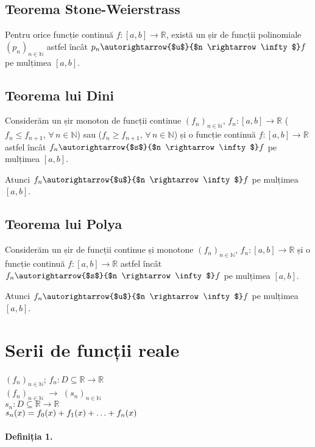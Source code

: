 \subsection{Teorema Stone-Weierstrass}
Pentru orice funcție continuă $f:[a,b] \rightarrow \mathbb{R}$, există un
șir de funcții polinomiale $(p_{n})_{n \in \mathbb{N}}$ astfel încât $p_{n}
\autorightarrow{$u$}{$n \rightarrow \infty$} f$ pe mulțimea $[a, b]$.

\subsection{Teorema lui Dini}
Considerăm un șir monoton de funcții continue $(f_{n})_{n \in \mathbb{N}}$,
$f_{n}: [a, b] \rightarrow \mathbb{R}$ ($f_{n} \leq f_{n+1}$, $\forall \, n
\in \mathbb{N}$) sau ($f_{n} \geq f_{n+1}$, $\forall \, n \in \mathbb{N}$)
și o funcție continuă $f: [a, b] \rightarrow \mathbb{R}$ astfel încât $f_{n}
\autorightarrow{$s$}{$n \rightarrow \infty$} f$ pe mulțimea $[a, b]$.

Atunci $f_{n} \autorightarrow{$u$}{$n \rightarrow \infty$} f$ pe mulțimea
$[a, b]$.

\subsection{Teorema lui Polya}
Considerăm un șir de funcții continue și monotone $(f_{n})_{n \in
\mathbb{N}}$, $f_{n}:[a,b] \rightarrow \mathbb{R}$ și o funcție continuă
$f:[a,b] \rightarrow \mathbb{R}$ astfel încât
$f_{n} \autorightarrow{$s$}{$n \rightarrow \infty$} f$ pe mulțimea $[a, b]$.

Atunci $f_{n} \autorightarrow{$u$}{$n \rightarrow \infty$} f$ pe mulțimea
$[a, b]$.

\section{Serii de funcții reale}

$(f_{n})_{n \in \mathbb{N}}$; $f_{n}: D \subseteq \mathbb{R} \rightarrow
\mathbb{R}$ \\
$(f_{n})_{n \in \mathbb{N}}$ $\rightarrow$ $(s_{n})_{n \in \mathbb{N}}$ \\
$s_{n}:D \subseteq \mathbb{R} \rightarrow \mathbb{R}$ \\
$s_{n}(x) = f_{0}(x) + f_{1}(x) + \mathellipsis + f_{n}(x)$

\paragraph*{Definiția 1.}

